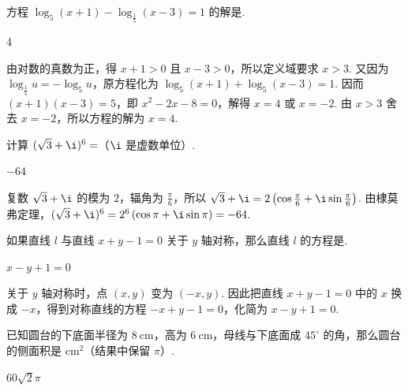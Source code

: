 \documentclass[UTF8,a4paper,oneside,11pt]{ctexbook}
\begin{document}
\begin{problem}
方程 \(\log_5(x+1)-\log_{\frac{1}{5}}(x-3)=1\) 的解是\fillinblank{}.
\end{problem}

\begin{answer}
4
\end{answer}

\begin{solution}
由对数的真数为正，得 \(x+1>0\) 且 \(x-3>0\)，所以定义域要求 \(x>3\). 又因为 \(\log_{\frac{1}{5}}u=-\log_5u\)，原方程化为 \(\log_5(x+1)+\log_5(x-3)=1\). 因而 \((x+1)(x-3)=5\)，即 \(x^2-2x-8=0\)，解得 \(x=4\) 或 \(x=-2\). 由 \(x>3\) 舍去 \(x=-2\)，所以方程的解为 \(x=4\).
\end{solution}

\begin{problem}
计算 \((\sqrt{3} + \i)^6=\)\fillinblank{}（\(\i\) 是虚数单位）.
\end{problem}

\begin{answer}
\(-64\)
\end{answer}

\begin{solution}
复数 \(\sqrt{3}+\i\) 的模为 \(2\)，辐角为 \(\frac{\pi}{6}\)，所以 \(\sqrt{3}+\i=2\left(\cos\frac{\pi}{6}+\i\sin\frac{\pi}{6}\right)\). 由棣莫弗定理，\((\sqrt{3}+\i)^6=2^6\left(\cos\pi+\i\sin\pi\right)=-64\).
\end{solution}

\begin{problem}
如果直线 \(l\) 与直线 \(x + y - 1 = 0\) 关于 \(y\) 轴对称，那么直线 \(l\) 的方程是\fillinblank{}.
\end{problem}

\begin{answer}
\(x - y + 1 = 0\)
\end{answer}

\begin{solution}
关于 \(y\) 轴对称时，点 \((x,y)\) 变为 \((-x,y)\). 因此把直线 \(x+y-1=0\) 中的 \(x\) 换成 \(-x\)，得到对称直线的方程 \(-x+y-1=0\)，化简为 \(x-y+1=0\).
\end{solution}

\begin{problem}
已知圆台的下底面半径为 \(8 \mathrm{~cm}\)，高为 \(6 \mathrm{~cm}\)，母线与下底面成 \(45^\circ\) 的角，那么圆台的侧面积是\fillinblank{} \(\mathrm{cm}^2\)（结果中保留 \(\pi\)）.
\end{problem}

\begin{answer}
\(60\sqrt{2}\pi\)
\end{answer}
\end{document}

